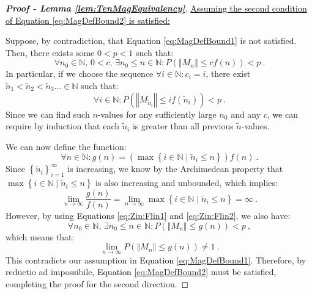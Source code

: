 \documentclass[10pt,a4paper]{amsart}
\begin{document}
\begin{proof}[\textbf{Proof - Lemma \ref{lem:TenMagEquivalency}}]
\underline{\textcolor{black}{Assuming the second condition of Equation \ref{eq:MagDefBound2} is satisfied:}}

Suppose, by contradiction, that \textcolor{black}{Equation} \ref{eq:MagDefBound1} is not satisfied. Then, there exists some \(0 < p < 1\) such that:
\begin{equation}
\forall n_0 \in \mathbb{N},\, 0 < c,\, \exists n_0 \leq n \in \mathbb{N}: P\left(\left\Vert M_n\right\Vert \leq cf\left(n\right)\right) < p \ .
\end{equation}
In particular, if we choose the sequence \(\forall i \in \mathbb{N}: c_i = i\), there exist \(\tilde{n}_1 < \tilde{n}_2 < \tilde{n}_3 \dots \in \mathbb{N}\) such that:
\begin{equation}
\forall i \in \mathbb{N}: P\left(\left\Vert M_{\tilde{n}_i}\right\Vert \leq if\left(\tilde{n}_i\right)\right) < p \ .
\end{equation}
Since we can find such \(n\)-values for any sufficiently large \(n_0\) and any \(c\), \textcolor{black}{we} can require by induction that each \(\tilde{n}_i\) is greater than all previous \(\tilde{n}\)-values. 

We can now define the function:
\begin{equation}
\forall n \in \mathbb{N}: g\left(n\right) = \left(\max\left\{ i \in \mathbb{N} \mid \tilde{n}_i \leq n\right\}\right) f\left(n\right) \ .
\label{eq:Zin:Flin2}
\end{equation}
Since \(\left\{ \tilde{n}_i\right\}_{i=1}^{\infty}\) is increasing, we know by the Archimedean property that \(\max\left\{ i \in \mathbb{N} \mid \tilde{n}_i \leq n\right\}\) is also increasing and unbounded, which implies:
\begin{equation}
\lim_{n \rightarrow \infty} \frac{g\left(n\right)}{f\left(n\right)} = \lim_{n \rightarrow \infty} \max\left\{ i \in \mathbb{N} \mid \tilde{n}_i \leq n\right\} = \infty \ .
\end{equation}
However, by using \textcolor{black}{Equations} \ref{eq:Zin:Flin1} \textcolor{black}{and} \ref{eq:Zin:Flin2}, we also have:
\begin{equation}
    \forall n_0 \in \mathbb{N},\, \exists n_0 \leq n \in \mathbb{N}: P\left(\left\Vert M_n\right\Vert \leq g\left(n\right)\right) < p \ ,
\end{equation}
which means that:
\begin{equation}
\lim_{n \rightarrow \infty} P\left(\left\Vert M_n\right\Vert \leq g\left(n\right)\right) \neq 1 \ .
\end{equation}
This contradicts our assumption in \textcolor{black}{Equation} \ref{eq:MagDefBound1}. Therefore, by reductio ad impossibile, \textcolor{black}{Equation} \ref{eq:MagDefBound2} must be satisfied, completing the proof for the second direction.
\end{proof}
\end{document}
